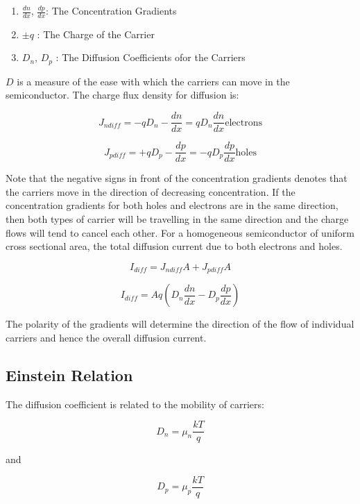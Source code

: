 \documentclass[a4paper,12pt]{article}
\begin{document}
\begin{enumerate}

\item

$\frac{dn}{dx}$, $\frac{dp}{dx}$: The Concentration Gradients

\item

$\pm q$ : The Charge of the Carrier

\item

$D_{n}$, $D_{p}$ : The Diffusion Coefficients ofor the Carriers

\end{enumerate}

$D$ is a measure of the ease with which the carriers can move
in the semiconductor. The charge flux density for diffusion is:

\[ J_{n diff} = - q D_{n} - \frac{dn}{dx} = q D_{n} \frac{dn}{dx}
\mbox{electrons} \]

\[ J_{p diff} = + q D_{p} - \frac{dp}{dx} = - q D_{p} \frac{dp}{dx}
\mbox{holes} \]

Note that the negative signs in front of the concentration
gradients denotes that the carriers move in the direction of decreasing
concentration. If the concentration gradients for both holes and
electrons are in the same direction, then both types of carrier will be
travelling in the same direction and the charge flows will tend to
cancel each other. For a homogeneous semiconductor of uniform cross
sectional area, the total diffusion current due to both electrons and
holes.


\[ I_{diff} = J_{n diff} A + J_{p diff} A \]

\[ I_{diff} = A q \left(D_{n} \frac{dn}{dx} - D_{p} \frac{dp}{dx}
\right) \]

The polarity of the gradients will determine the direction of the flow
of individual carriers and hence the overall diffusion current.

\subsection{Einstein Relation}

The diffusion coefficient is related to the mobility of carriers:

\[ D_{n} = \mu_{n} \frac{k T}{q} \]

and

\[ D_{p} = \mu_{p} \frac{k T}{q} \]
\end{document}
